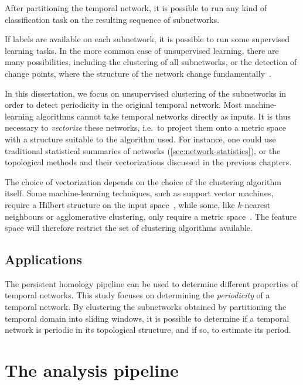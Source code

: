 \documentclass[a4paper,11pt,openany,extrafontsizes]{memoir}
\begin{document}
After partitioning the temporal network, it is possible to run any
kind of classification task on the resulting sequence of subnetworks.

If labels are available on each subnetwork, it is possible to run some
supervised learning tasks. In the more common case of unsupervised
learning, there are many possibilities, including the clustering of
all subnetworks, or the detection of change points, where the
structure of the network change
fundamentally~\cite{peel_detecting_2014}.

In this dissertation, we focus on unsupervised clustering of the
subnetworks in order to detect periodicity in the original temporal
network. Most machine-learning algorithms cannot take temporal
networks directly as inputs. It is thus necessary to \emph{vectorize}
these networks, i.e.\ to project them onto a metric space with a
structure suitable to the algorithm used. For instance, one could use
traditional statistical summaries of networks
(\autoref{sec:network-statistics}), or the topological methods and
their vectorizations discussed in the previous chapters.

The choice of vectorization depends on the choice of the clustering
algorithm itself. Some machine-learning techniques, such as support
vector machines, require a Hilbert structure on the input
space~\cite{carriere_sliced_2017, hastie_elements_2009}, while some,
like $k$-nearest neighbours or agglomerative clustering, only require
a metric space~\cite{hastie_elements_2009}. The feature space will
therefore restrict the set of clustering algorithms available.

\subsection{Applications}%
\label{sec:applications}

The persistent homology pipeline can be used to determine different
properties of temporal networks. This study focuses on determining the
\emph{periodicity} of a temporal network. By clustering the
subnetworks obtained by partitioning the temporal domain into sliding
windows, it is possible to determine if a temporal network is periodic
in its topological structure, and if so, to estimate its
period.

\section{The analysis pipeline}%
\label{sec:analysis-pipeline}
\end{document}
